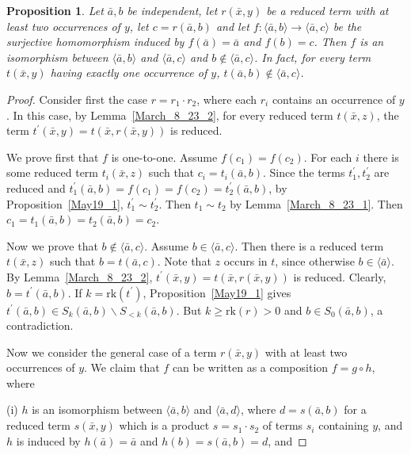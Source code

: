 \documentclass[a4paper, 11pt]{article}
\newcommand{\rk}{\mathrm{rk}}
\theoremstyle{note}
\newtheorem{prop}[thm]{Proposition}
\begin{document}
\bigskip

\begin{prop}\label{finalprop} Let $\bar{a},b$ be independent, let $r(\bar{x},y)$ be a reduced term with at least two occurrences of $y$, let $c=r(\bar{a},b)$  and let $f:\langle \bar{a},b\rangle\rightarrow \langle\bar{a},c\rangle$ be the surjective homomorphism induced by $f(\bar{a})=\bar{a}$  and $f(b)=c$. Then  $f$ is an isomorphism between $\langle \bar{a},b\rangle$ and $\langle\bar{a},c\rangle$  and  $b\not \in\langle\bar{a},c\rangle$. In fact, for every term $t(\bar{x},y)$ having exactly one occurrence of $y$,  $t(\bar{a},b)\not \in\langle \bar{a},c\rangle$.
\end{prop}
\begin{proof} Consider first the case  $r= r_1\cdot r_2$, where each $r_i$ contains an occurrence of $y$.  In this case, by Lemma~\ref{March_8_23_2}, for every reduced term $t(\bar{x},z)$,  the term $t^\prime(\bar{x},y)= t(\bar{x},r(\bar{x},y))$ is reduced. 

We prove first that $f$ is one-to-one.  Assume $f(c_1)= f(c_2)$. For each $i$ there is some reduced term $t_i(\bar{x},z)$  such that  $c_i= t_i(\bar{a},b)$.  Since the terms $t_1^\prime,t_2^\prime$ are reduced and  $t_1^\prime(\bar{a},b)= f(c_1)= f(c_2)=t_2^\prime(\bar{a},b)$, by  Proposition~\ref{May19_1},  $t_1^\prime\sim t_2^\prime$.  Then  $t_1\sim t_2$ by Lemma~\ref{March_8_23_1}. Then  $c_1=t_1(\bar{a},b)=t_2(\bar{a},b)= c_2$.

Now we prove that $b\not\in \langle\bar{a},c\rangle$. Assume $b\in\langle\bar{a},c\rangle$. Then there is a reduced term $t(\bar{x},z)$ such that $b= t(\bar{a},c)$. Note that $z$ occurs in $t$, since otherwise $b\in\langle \bar{a}\rangle$.  By Lemma~\ref{March_8_23_2},  $t^\prime(\bar{x},y)= t(\bar{x},r(\bar{x},y))$ is reduced. Clearly, $b= t^\prime(\bar{a},b)$.  If $k=\rk(t^\prime)$, Proposition~\ref{May19_1} gives  $t^\prime(\bar{a},b)\in S_k(\bar{a},b)\smallsetminus S_{<k}(\bar{a},b)$.  But $k\geq \rk(r) >0$ and  $b\in S_0(\bar{a},b)$, a contradiction.

Now we consider the general case of a term $r(\bar{x},y)$  with at least two occurrences of $y$.  We claim that $f$ can be written as a composition $f=g\circ h$, where

(i)  $h$  is an isomorphism between $\langle \bar{a},b\rangle$ and $\langle \bar{a},d\rangle$,  where $d= s(\bar{a},b)$  for a reduced term  $s(\bar{x},y)$  which is a product  $s=s_1\cdot s_2$ of terms $s_i$ containing $y$,   and  $h$ is induced by  $h(\bar{a})= \bar{a}$  and $h(b)=s(\bar{a},b)=d$,  and


\end{proof}
\end{document}
